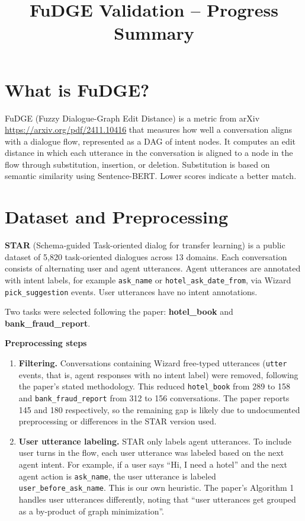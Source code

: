 \documentclass[11pt,a4paper]{article}
\title{\textbf{FuDGE Validation -- Progress Summary}}
\author{}
\date{}
\begin{document}
\maketitle

\section{What is FuDGE?}

FuDGE (Fuzzy Dialogue-Graph Edit Distance) is a metric from arXiv
\url{https://arxiv.org/pdf/2411.10416} that measures how well a conversation aligns with a dialogue flow, represented as a DAG of intent nodes. It computes an edit distance in which each utterance in the conversation is aligned to a node in the flow through substitution, insertion, or deletion. Substitution is based on semantic similarity using Sentence-BERT. Lower scores indicate a better match.

\section{Dataset and Preprocessing}

\textbf{STAR} (Schema-guided Task-oriented dialog for transfer learning) is a public dataset of 5,820 task-oriented dialogues across 13 domains. Each conversation consists of alternating user and agent utterances. Agent utterances are annotated with intent labels, for example \texttt{ask\_name} or \texttt{hotel\_ask\_date\_from}, via Wizard \texttt{pick\_suggestion} events. User utterances have no intent annotations.

Two tasks were selected following the paper: \textbf{hotel\_book} and \textbf{bank\_fraud\_report}.

\textbf{Preprocessing steps}
\begin{enumerate}
    \item \textbf{Filtering.} Conversations containing Wizard free-typed utterances (\texttt{utter} events, that is, agent responses with no intent label) were removed, following the paper's stated methodology. This reduced \texttt{hotel\_book} from 289 to 158 and \texttt{bank\_fraud\_report} from 312 to 156 conversations. The paper reports 145 and 180 respectively, so the remaining gap is likely due to undocumented preprocessing or differences in the STAR version used.

    \item \textbf{User utterance labeling.} STAR only labels agent utterances. To include user turns in the flow, each user utterance was labeled based on the next agent intent. For example, if a user says ``Hi, I need a hotel'' and the next agent action is \texttt{ask\_name}, the user utterance is labeled \texttt{user\_before\_ask\_name}. This is our own heuristic. The paper's Algorithm 1 handles user utterances differently, noting that ``user utterances get grouped as a by-product of graph minimization''.
\end{enumerate}
\end{document}
